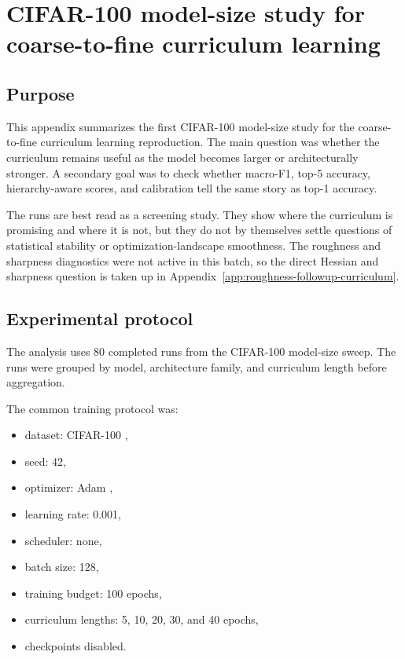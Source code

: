 \chapter{CIFAR-100 model-size study for coarse-to-fine curriculum learning}
\label{app:cifar100-model-size-curriculum}

\section{Purpose}

This appendix summarizes the first CIFAR-100 \cite{krizhevsky2009learning}
model-size study for the coarse-to-fine curriculum learning reproduction. The
main question was whether the curriculum remains useful as the model becomes
larger or architecturally stronger. A secondary goal was to check whether
macro-F1, top-5 accuracy, hierarchy-aware scores, and calibration tell the same
story as top-1 accuracy.

The runs are best read as a screening study. They show where the curriculum is
promising and where it is not, but they do not by themselves settle questions of
statistical stability or optimization-landscape smoothness. The roughness and
sharpness diagnostics were not active in this batch, so the direct Hessian and
sharpness question is taken up in Appendix~\ref{app:roughness-followup-curriculum}.

\section{Experimental protocol}

The analysis uses 80 completed runs from the CIFAR-100 model-size sweep. The
runs were grouped by model, architecture family, and curriculum length before
aggregation.

The common training protocol was:

\begin{itemize}
    \item dataset: CIFAR-100 \cite{krizhevsky2009learning},
    \item seed: 42,
    \item optimizer: Adam \cite{kingma2015adam},
    \item learning rate: 0.001,
    \item scheduler: none,
    \item batch size: 128,
    \item training budget: 100 epochs,
    \item curriculum lengths: 5, 10, 20, 30, and 40 epochs,
    \item checkpoints disabled.
\end{itemize}


